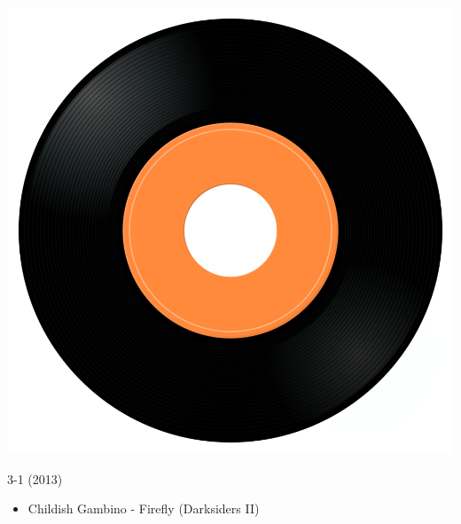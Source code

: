 \begin{minipage}[t]{0.25\textwidth}\vspace{0pt}
	\captionsetup{type=figure}
	\includegraphics[width=\textwidth]{Images/cover.png}
	\caption*{3-1 (2013)}
\end{minipage}
\begin{minipage}[t]{0.25\textwidth}\vspace{0pt}
	\begin{itemize}[nosep,leftmargin=1em,labelwidth=*,align=left]
		\setlength{\itemsep}{0pt}
		\item Childish Gambino - Firefly (Darksiders II)
	\end{itemize}
\end{minipage}
